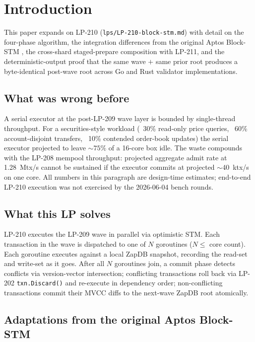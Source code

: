 \section{Introduction}

This paper expands on LP-210 (\texttt{lps/LP-210-block-stm.md}) with
detail on the four-phase algorithm, the integration differences from
the original Aptos Block-STM \cite{blockstm2022}, the cross-shard
staged-prepare composition with LP-211, and the deterministic-output
proof that the same wave $+$ same prior root produces a byte-identical
post-wave root across Go and Rust validator implementations.

\subsection{What was wrong before}

A serial executor at the post-LP-209 wave layer is bounded by
single-thread throughput. For a securities-style workload (~30\%
read-only price queries, ~60\% account-disjoint transfers, ~10\%
contended order-book updates) the serial executor projected to
leave $\sim 75\%$ of a 16-core box idle. The waste compounds with
the LP-208 mempool throughput: projected aggregate admit rate at
\SI{1.28}{\mega tx/s} cannot be sustained if the executor commits
at projected $\sim$\SI{40}{\kilo tx/s} on one core. All numbers in
this paragraph are design-time estimates; end-to-end LP-210
execution was not exercised by the 2026-06-04 bench rounds.

\subsection{What this LP solves}

LP-210 executes the LP-209 wave in parallel via optimistic STM. Each
transaction in the wave is dispatched to one of $N$ goroutines
($N \leq$ core count). Each goroutine executes against a local
ZapDB snapshot, recording the read-set and write-set as it goes.
After all $N$ goroutines join, a commit phase detects conflicts via
version-vector intersection; conflicting transactions roll back via
LP-202 \texttt{txn.Discard()} and re-execute in dependency order;
non-conflicting transactions commit their MVCC diffs to the
next-wave ZapDB root atomically.

\subsection{Adaptations from the original Aptos Block-STM}

